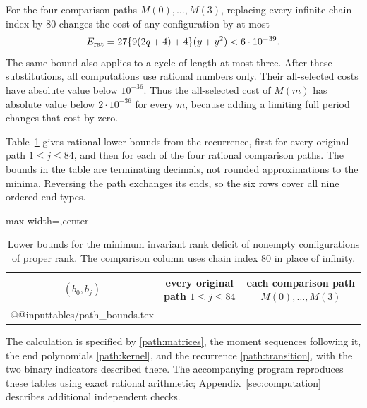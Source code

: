 For the four comparison paths $M(0),\ldots,M(3)$, replacing every infinite
chain index by $80$ changes the cost of any configuration by at most
\begin{equation}\label{path:proxyerror}
 E_{\rm rat}=27\{9(2q+4)+4\}(y+y^2)<6\cdot10^{-39}.
\end{equation}
The same bound also applies to a cycle of length at most three. After these
substitutions, all computations use rational numbers only. Their all-selected
costs have absolute value below $10^{-36}$. Thus the all-selected
cost of $M(m)$ has absolute value below $2\cdot10^{-36}$ for every $m$,
because adding a limiting full period changes that cost by zero.

Table~\ref{path:bounds} gives rational lower bounds from the recurrence,
first for every original path $1\le j\le84$, and then for each of the four
rational comparison paths. The bounds in the table are terminating decimals,
not rounded approximations to the minima. Reversing the path exchanges its
ends, so the six rows cover all nine ordered end types.

\begin{table}[ht]
\centering
\caption{Lower bounds for the minimum invariant rank deficit of nonempty
configurations of proper rank. The comparison column uses chain index $80$
in place of infinity.}
\label{path:bounds}
\begin{adjustbox}{max width=\textwidth,center}
\begin{tabular}{ccc}
\toprule
$(b_0,b_j)$& every original path $1\le j\le84$ & each comparison path $M(0),\ldots,M(3)$\\
\midrule
\csname @@input\endcsname tables/path_bounds.tex
\bottomrule
\end{tabular}
\end{adjustbox}
\end{table}

The calculation is specified by \eqref{path:matrices}, the moment
sequences following it, the end polynomials \eqref{path:kernel}, and the
recurrence \eqref{path:transition}, with the two binary indicators described
there.
The accompanying program reproduces these tables using exact rational
arithmetic; Appendix~\ref{sec:computation} describes additional independent
checks.

